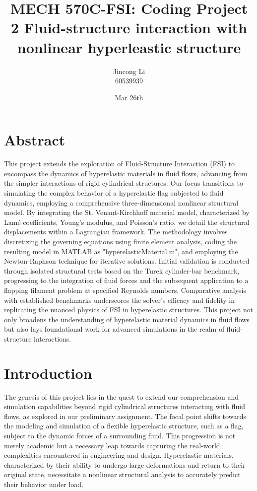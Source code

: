 \documentclass[a4paper,12pt]{article} %
\begin{document}
\setlength{\parskip}{1em} 
\setlength{\parindent}{0pt}
\newcommand{\vect}[1]{\mathbf{#1}}

\title{MECH 570C-FSI: Coding Project 2
Fluid-structure interaction with nonlinear hyperleastic structure}
\author{Jincong Li \\ 60539939}
\date{Mar 26th}
\maketitle

\section*{Abstract}
This project extends the exploration of Fluid-Structure Interaction (FSI) 
to encompass the dynamics of hyperelastic materials in fluid flows, advancing 
from the simpler interactions of rigid cylindrical structures. Our focus 
transitions to simulating the complex behavior of a hyperelastic flag 
subjected to fluid dynamics, employing a comprehensive three-dimensional 
nonlinear structural model. By integrating the St. Venant-Kirchhoff material 
model, characterized by Lamé coefficients, Young's modulus, and Poisson's 
ratio, we detail the structural displacements within a Lagrangian framework. 
The methodology involves discretizing the governing equations using finite 
element analysis, coding the resulting model in MATLAB as "hyperelasticMaterial.m", 
and employing the Newton-Raphson technique for iterative solutions. Initial 
validation is conducted through isolated structural tests based on the 
Turek cylinder-bar benchmark, progressing to the integration of fluid 
forces and the subsequent application to a flapping filament problem at 
specified Reynolds numbers. Comparative analysis with established benchmarks 
underscores the solver's efficacy and fidelity in replicating the nuanced 
physics of FSI in hyperelastic structures. This project not only broadens 
the understanding of hyperelastic material dynamics in fluid flows but 
also lays foundational work for advanced simulations in the realm of fluid-structure interactions.

\section*{Introduction}
The genesis of this project lies in the quest to extend our comprehension and simulation 
capabilities beyond rigid cylindrical structures interacting with fluid flows, 
as explored in our preliminary assignment. The focal point shifts towards the 
modeling and simulation of a flexible hyperelastic structure, such as a flag, 
subject to the dynamic forces of a surrounding fluid. This progression is not 
merely academic but a necessary leap towards capturing the real-world complexities 
encountered in engineering and design. Hyperelastic materials, characterized by 
their ability to undergo large deformations and return to their original state, 
necessitate a nonlinear structural analysis to accurately predict their behavior under load.
\end{document}

